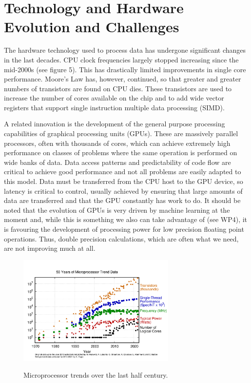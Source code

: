 \section{Technology and Hardware Evolution and Challenges}


The hardware technology used to process data has undergone significant changes in the last decades. CPU clock frequencies largely stopped increasing since the mid-2000s (see figure 5). This has drastically limited improvements in single core performance. Moore’s Law has, however, continued, so that greater and greater numbers of transistors are found on CPU dies. These transistors are used to increase the number of cores available on the chip and to add wide vector registers that support single instruction multiple data processing (SIMD).

A related innovation is the development of the general purpose processing capabilities of graphical processing units (GPUs). These are massively parallel processors, often with thousands of cores, which can achieve extremely high performance on classes of problems where the same operation is performed on wide banks of data. Data access patterns and predictability of code flow are critical to achieve good performance and not all problems are easily adapted to this model. Data must be transferred from the CPU host to the GPU device, so latency is critical to control, usually achieved by ensuring that large amounts of data are transferred and that the GPU constantly has work to do. It should be noted that the evolution of GPUs is very driven by machine learning at the moment and, while this is something we also can take advantage of (see WP4), it is favouring the development of processing power for low precision floating point operations. Thus, double precision calculations, which are often what we need, are not improving much at all.

\begin{figure}[htbp]
\begin{center}
\includegraphics[width=0.7\textwidth]{figures/Figure5} \\ 
\caption{Microprocessor trends over the last half century.}
\label{figures:Fig5}
\end{center}
\end{figure}


